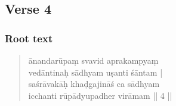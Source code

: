 \documentclass[12pt]{article}
\newcommand{\emdash} {\hspace{0em}—\hspace{0em}}
\begin{document}
% 

\subsection{Verse 4}
\subsubsection{Root text}
\begin{quote}
	ānandarūpaṃ svavid aprakampyaṃ \\
	vedāntinaḥ sādhyam uṣanti śāntam\footnoteB{
		śāntam] \corr ; sāntam \MS\ \EDD ; \emph{no reflex in} \TIB
	} |\\
	saśrāvakāḥ\footnoteB{
		saśrāvakāḥ] \emd ; saśrāvakā \MS\ \EDD
	} khaḍgajināś ca sādhyam\\
	icchanti rūpādyupadher virāmam || 4 ||

% 
\end{quote}
\end{document}
